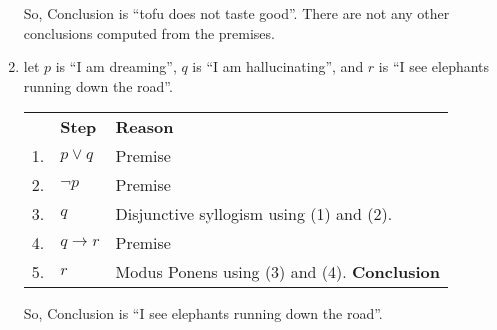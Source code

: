 \begin{enumerate}
    So, Conclusion is ``tofu does not taste good''. There are not any other conclusions computed from the premises.

    \item let $p$ is ``I am dreaming'', $q$ is ``I am hallucinating'', and $r$ is ``I see elephants running down the road''.
    
    \begin{tabular}{p{0.2cm} p{5cm} p{8cm}}
        & \textbf{Step} & \textbf{Reason}\\
        1.& $p \vee q$ & Premise \\
        2.& $\neg p$ & Premise \\
        3.& $q$ & Disjunctive syllogism using (1) and (2).\\
        4.& $q \rightarrow r$ & Premise \\
        5.& $r$ & Modus Ponens using (3) and (4). \textbf{Conclusion}\\
    \end{tabular}

    So, Conclusion is ``I see elephants running down the road''.

\end{enumerate}